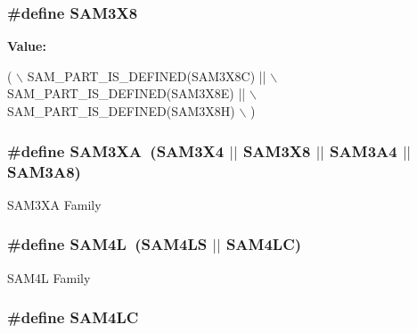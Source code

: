 \hypertarget{group__sam__part__macros__group_ga13be8353e38999aaca5c412c895c15da}{
\subsubsection[{S\-A\-M3\-X8}]{\setlength{\rightskip}{0pt plus 5cm}\#define S\-A\-M3\-X8}}\label{group__sam__part__macros__group_ga13be8353e38999aaca5c412c895c15da}
{\bfseries Value\-:}
\begin{DoxyCode}
( \(\backslash\)
        SAM\_PART\_IS\_DEFINED(SAM3X8C) || \(\backslash\)
        SAM\_PART\_IS\_DEFINED(SAM3X8E) || \(\backslash\)
        SAM\_PART\_IS\_DEFINED(SAM3X8H) \(\backslash\)
        )
\end{DoxyCode}
\hypertarget{group__sam__part__macros__group_gaae4990dfaa4eeed17d8a0351cca02fdd}{
\subsubsection[{S\-A\-M3\-X\-A}]{\setlength{\rightskip}{0pt plus 5cm}\#define S\-A\-M3\-X\-A~({\bf S\-A\-M3\-X4} $|$$|$ {\bf S\-A\-M3\-X8} $|$$|$ {\bf S\-A\-M3\-A4} $|$$|$ {\bf S\-A\-M3\-A8})}}\label{group__sam__part__macros__group_gaae4990dfaa4eeed17d8a0351cca02fdd}
S\-A\-M3\-X\-A Family \hypertarget{group__sam__part__macros__group_gabf4b4fa802cbb57480225dd3c8f7a41b}{
\subsubsection[{S\-A\-M4\-L}]{\setlength{\rightskip}{0pt plus 5cm}\#define S\-A\-M4\-L~({\bf S\-A\-M4\-L\-S} $|$$|$ {\bf S\-A\-M4\-L\-C})}}\label{group__sam__part__macros__group_gabf4b4fa802cbb57480225dd3c8f7a41b}
S\-A\-M4\-L Family \hypertarget{group__sam__part__macros__group_gaff053c1dc2a1aaf1e97428da4cb49704}{
\subsubsection[{S\-A\-M4\-L\-C}]{\setlength{\rightskip}{0pt plus 5cm}\#define S\-A\-M4\-L\-C}}\label{group__sam__part__macros__group_gaff053c1dc2a1aaf1e97428da4cb49704}
